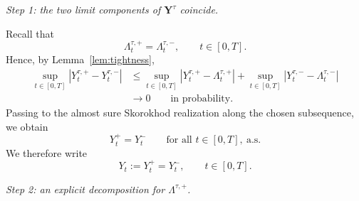 \documentclass[letterpaper]{article}
\numberwithin{equation}{section}
\theoremstyle{definition}
\theoremstyle{remark}
\begin{document}
\medskip
\noindent
\textit{Step 1: the two limit components of $\mathbf Y^\tau$ coincide.}

Recall that
\[
\Lambda_t^{\tau,+}=\Lambda_t^{\tau,-},
\qquad t\in[0,T].
\]
Hence, by Lemma~\ref{lem:tightness},
\begin{align*}
\sup_{t\in[0,T]}\left|Y_t^{\tau,+}-Y_t^{\tau,-}\right|
  &\le
  \sup_{t\in[0,T]}\left|Y_t^{\tau,+}-\Lambda_t^{\tau,+}\right|
  +
  \sup_{t\in[0,T]}\left|Y_t^{\tau,-}-\Lambda_t^{\tau,-}\right|
  \\
  &\to0
  \qquad\text{in probability.}
\end{align*}
Passing to the almost sure Skorokhod realization along the chosen subsequence,
we obtain
\[
  Y_t^+=Y_t^-
  \qquad\text{for all }t\in[0,T],\ \text{a.s.}
\]
We therefore write
\[
  Y_t:=Y_t^+=Y_t^-,
  \qquad t\in[0,T].
\]

\medskip
\noindent
\textit{Step 2: an explicit decomposition for $\Lambda^{\tau,+}$.}
\end{document}
